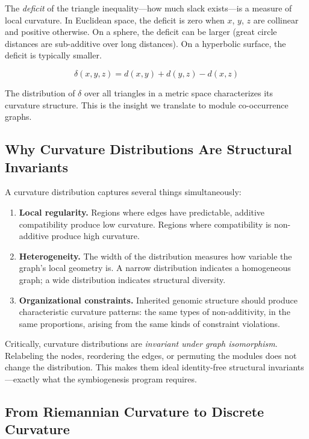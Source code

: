 \documentclass{../yalumba}
\begin{document}
The \emph{deficit} of the triangle inequality---how much slack exists---is
a measure of local curvature.  In Euclidean space, the deficit is zero
when $x$, $y$, $z$ are collinear and positive otherwise.  On a sphere, the
deficit can be larger (great circle distances are sub-additive over long
distances).  On a hyperbolic surface, the deficit is typically smaller.

\begin{equation}
  \delta(x, y, z) = d(x, y) + d(y, z) - d(x, z)
  \label{eq:deficit}
\end{equation}

The distribution of $\delta$ over all triangles in a metric space
characterizes its curvature structure.  This is the insight we translate
to module co-occurrence graphs.

\subsection{Why Curvature Distributions Are Structural Invariants}

A curvature distribution captures several things simultaneously:

\begin{enumerate}
  \item \textbf{Local regularity.}  Regions where edges have predictable,
    additive compatibility produce low curvature.  Regions where
    compatibility is non-additive produce high curvature.
  \item \textbf{Heterogeneity.}  The width of the distribution measures
    how variable the graph's local geometry is.  A narrow distribution
    indicates a homogeneous graph; a wide distribution indicates structural
    diversity.
  \item \textbf{Organizational constraints.}  Inherited genomic structure
    should produce characteristic curvature patterns: the same types of
    non-additivity, in the same proportions, arising from the same kinds
    of constraint violations.
\end{enumerate}

Critically, curvature distributions are \emph{invariant under graph
isomorphism}.  Relabeling the nodes, reordering the edges, or permuting
the modules does not change the distribution.  This makes them ideal
identity-free structural invariants---exactly what the symbiogenesis
program requires.

\subsection{From Riemannian Curvature to Discrete Curvature}
\end{document}
